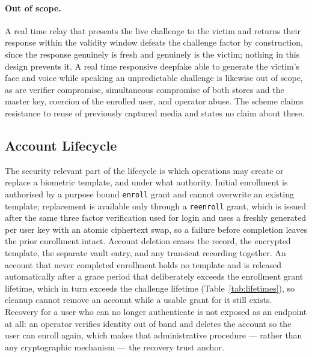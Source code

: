 \documentclass[runningheads]{llncs}
\begin{document}
{\paragraph{Out of scope.} A real time relay that presents the live challenge to the victim and returns their response within the validity window defeats the challenge factor by construction, since the response genuinely is fresh and genuinely is the victim; nothing in this design prevents it. A real time responsive deepfake able to generate the victim's face and voice while speaking an unpredictable challenge is likewise out of scope, as are verifier compromise, simultaneous compromise of both stores and the master key, coercion of the enrolled user, and operator abuse. The scheme claims resistance to reuse of previously captured media and states no claim about these.
}

\technicalsubsections
\renewcommand{\algorithmicrequire}{\textbf{Input:}}
\renewcommand{\algorithmicensure}{\textbf{Output:}}

\recentcomparison

\subsection{Account Lifecycle}\label{sec:lifecycle}
The security relevant part of the lifecycle is which operations may create or replace a biometric template, and under what authority. Initial enrollment is authorised by a purpose bound \texttt{enroll} grant and cannot overwrite an existing template; replacement is available only through a \texttt{reenroll} grant, which is issued after the same three factor verification used for login and uses a freshly generated per user key with an atomic ciphertext swap, so a failure before completion leaves the prior enrollment intact. Account deletion erases the record, the encrypted template, the separate vault entry, and any transient recording together. An account that never completed enrollment holds no template and is released automatically after a grace period that deliberately exceeds the enrollment grant lifetime, which in turn exceeds the challenge lifetime (Table~\ref{tab:lifetimes}), so cleanup cannot remove an account while a usable grant for it still exists. Recovery for a user who can no longer authenticate is not exposed as an endpoint at all: an operator verifies identity out of band and deletes the account so the user can enroll again, which makes that administrative procedure --- rather than any cryptographic mechanism --- the recovery trust anchor.
\end{document}
